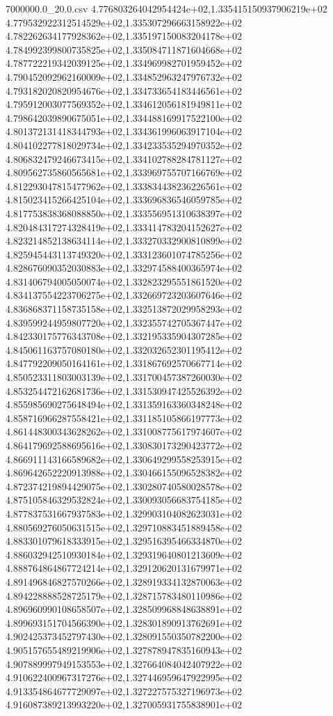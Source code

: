\begin{filecontents*}{7000000.0_20.0.csv}
4.776803264042954424e+02,1.335415150937906219e+02
4.779532922312514529e+02,1.335307296663158922e+02
4.782262634177928362e+02,1.335197150083204178e+02
4.784992399800735825e+02,1.335084711871604668e+02
4.787722219342039125e+02,1.334969982701959452e+02
4.790452092962160009e+02,1.334852963247976732e+02
4.793182020820954676e+02,1.334733654183446561e+02
4.795912003077569352e+02,1.334612056181949811e+02
4.798642039890675051e+02,1.334488169917522100e+02
4.801372131418344793e+02,1.334361996063917104e+02
4.804102277818029734e+02,1.334233535294970352e+02
4.806832479246673415e+02,1.334102788284781127e+02
4.809562735860565681e+02,1.333969755707166769e+02
4.812293047815477962e+02,1.333834438236226561e+02
4.815023415266425104e+02,1.333696836546059785e+02
4.817753838368088850e+02,1.333556951310638397e+02
4.820484317274328419e+02,1.333414783204152627e+02
4.823214852138634114e+02,1.333270332900810899e+02
4.825945443113749320e+02,1.333123601074785256e+02
4.828676090352030883e+02,1.332974588400365974e+02
4.831406794005050074e+02,1.332823295551861520e+02
4.834137554223706275e+02,1.332669723203607646e+02
4.836868371158735158e+02,1.332513872029958293e+02
4.839599244959807720e+02,1.332355742705367447e+02
4.842330175776343708e+02,1.332195335904307285e+02
4.845061163757080180e+02,1.332032652301195412e+02
4.847792209050164161e+02,1.331867692570667714e+02
4.850523311803003139e+02,1.331700457387260030e+02
4.853254472162681736e+02,1.331530947425526392e+02
4.855985690275648494e+02,1.331359163360348248e+02
4.858716966287558421e+02,1.331185105866197773e+02
4.861448300343628262e+02,1.331008775617974607e+02
4.864179692588695616e+02,1.330830173290423772e+02
4.866911143166589682e+02,1.330649299558253915e+02
4.869642652220913988e+02,1.330466155096528382e+02
4.872374219894429075e+02,1.330280740580028578e+02
4.875105846329532824e+02,1.330093056683754185e+02
4.877837531667937583e+02,1.329903104082623031e+02
4.880569276050631515e+02,1.329710883451889458e+02
4.883301079618333915e+02,1.329516395466334870e+02
4.886032942510930184e+02,1.329319640801213609e+02
4.888764864867724214e+02,1.329120620131679971e+02
4.891496846827570266e+02,1.328919334132870063e+02
4.894228888528725179e+02,1.328715783480110986e+02
4.896960990108658507e+02,1.328509968848638891e+02
4.899693151704566390e+02,1.328301890913762691e+02
4.902425373452797430e+02,1.328091550350782200e+02
4.905157655489219906e+02,1.327878947835160943e+02
4.907889997949153553e+02,1.327664084042407922e+02
4.910622400967317276e+02,1.327446959647922995e+02
4.913354864677729097e+02,1.327227575327196973e+02
4.916087389213993220e+02,1.327005931755838901e+02

\end{filecontents*}
